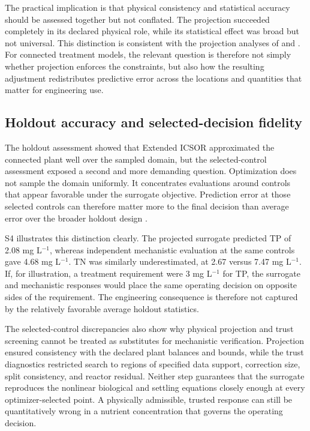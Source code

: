 The practical implication is that physical consistency and statistical accuracy should be assessed together but not conflated. The projection succeeded completely in its declared physical role, while its statistical effect was broad but not universal. This distinction is consistent with the projection analyses of \citet{SturmSilva2024} and \citet{KircherVotsmeier2025}. For connected treatment models, the relevant question is therefore not simply whether projection enforces the constraints, but also how the resulting adjustment redistributes predictive error across the locations and quantities that matter for engineering use.

\subsection{Holdout accuracy and selected-decision fidelity}

The holdout assessment showed that Extended ICSOR approximated the connected plant well over the sampled domain, but the selected-control assessment exposed a second and more demanding question. Optimization does not sample the domain uniformly. It concentrates evaluations around controls that appear favorable under the surrogate objective. Prediction error at those selected controls can therefore matter more to the final decision than average error over the broader holdout design \citep{BhosekarIerapetritou2018,Pedrozo2025}.

S4 illustrates this distinction clearly. The projected surrogate predicted TP of 2.08 mg L$^{-1}$, whereas independent mechanistic evaluation at the same controls gave 4.68 mg L$^{-1}$. TN was similarly underestimated, at 2.67 versus 7.47 mg L$^{-1}$. If, for illustration, a treatment requirement were 3 mg L$^{-1}$ for TP, the surrogate and mechanistic responses would place the same operating decision on opposite sides of the requirement. The engineering consequence is therefore not captured by the relatively favorable average holdout statistics.

The selected-control discrepancies also show why physical projection and trust screening cannot be treated as substitutes for mechanistic verification. Projection ensured consistency with the declared plant balances and bounds, while the trust diagnostics restricted search to regions of specified data support, correction size, split consistency, and reactor residual. Neither step guarantees that the surrogate reproduces the nonlinear biological and settling equations closely enough at every optimizer-selected point. A physically admissible, trusted response can still be quantitatively wrong in a nutrient concentration that governs the operating decision.

